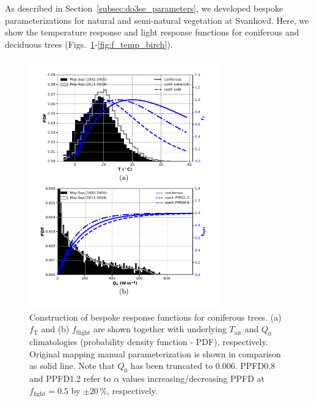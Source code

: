 \documentclass[bg, manuscript]{copernicus}
\begin{document}
As described in Section~\ref{subsec:do3se_parameters}, we developed bespoke parameterizations for natural and semi-natural vegetation at Svanhovd. Here, we show the temperature response and light response functions for coniferous and deciduous trees (Figs.~\ref{fig:f_temp_spruce}-\ref{fig:f_temp_birch}). 

\begin{figure}[t]
  \includegraphics[width=8.3cm]{figB2}
\caption{Construction of bespoke response functions for coniferous trees. (a) $f_\mathrm{T}$ and (b) $f_\mathrm{flight}$ are shown together with underlying $T_\mathrm{air}$ and $Q_0$ climatologies (probability density function - PDF), respectively. Original mapping manual parameterization is shown in comparison as solid line. Note that $Q_0$ has been truncated to $0.006$. PPFD0.8 and PPFD1.2 refer to $\alpha$ values increasing/decreasing PPFD at $f_\mathrm{light}=0.5$ by $\pm 20\,\%$, respectively.}
\label{fig:f_temp_spruce}
\end{figure}
\end{document}
